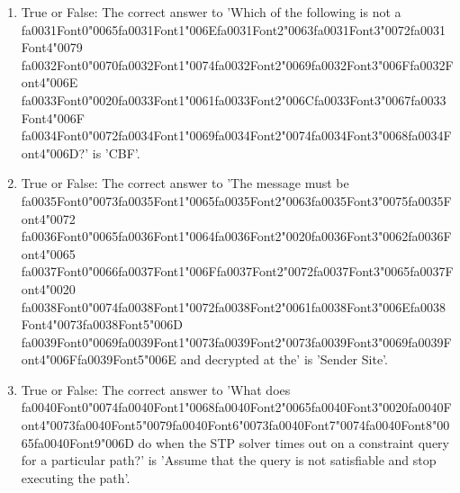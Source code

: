 \documentclass[12pt]{article}
\begin{document}
\begin{enumerate}[label=\arabic*.]
\item True or False: The correct answer to 'Which of the following is not a {\csname fa0031Font0\endcsname\char"0065}{\csname fa0031Font1\endcsname\char"006E}{\csname fa0031Font2\endcsname\char"0063}{\csname fa0031Font3\endcsname\char"0072}{\csname fa0031Font4\endcsname\char"0079} {\csname fa0032Font0\endcsname\char"0070}{\csname fa0032Font1\endcsname\char"0074}{\csname fa0032Font2\endcsname\char"0069}{\csname fa0032Font3\endcsname\char"006F}{\csname fa0032Font4\endcsname\char"006E} {\csname fa0033Font0\endcsname\char"0020}{\csname fa0033Font1\endcsname\char"0061}{\csname fa0033Font2\endcsname\char"006C}{\csname fa0033Font3\endcsname\char"0067}{\csname fa0033Font4\endcsname\char"006F} {\csname fa0034Font0\endcsname\char"0072}{\csname fa0034Font1\endcsname\char"0069}{\csname fa0034Font2\endcsname\char"0074}{\csname fa0034Font3\endcsname\char"0068}{\csname fa0034Font4\endcsname\char"006D}?' is 'CBF'.
\item True or False: The correct answer to 'The message must be {\csname fa0035Font0\endcsname\char"0073}{\csname fa0035Font1\endcsname\char"0065}{\csname fa0035Font2\endcsname\char"0063}{\csname fa0035Font3\endcsname\char"0075}{\csname fa0035Font4\endcsname\char"0072} {\csname fa0036Font0\endcsname\char"0065}{\csname fa0036Font1\endcsname\char"0064}{\csname fa0036Font2\endcsname\char"0020}{\csname fa0036Font3\endcsname\char"0062}{\csname fa0036Font4\endcsname\char"0065} {\csname fa0037Font0\endcsname\char"0066}{\csname fa0037Font1\endcsname\char"006F}{\csname fa0037Font2\endcsname\char"0072}{\csname fa0037Font3\endcsname\char"0065}{\csname fa0037Font4\endcsname\char"0020} {\csname fa0038Font0\endcsname\char"0074}{\csname fa0038Font1\endcsname\char"0072}{\csname fa0038Font2\endcsname\char"0061}{\csname fa0038Font3\endcsname\char"006E}{\csname fa0038Font4\endcsname\char"0073}{\csname fa0038Font5\endcsname\char"006D} {\csname fa0039Font0\endcsname\char"0069}{\csname fa0039Font1\endcsname\char"0073}{\csname fa0039Font2\endcsname\char"0073}{\csname fa0039Font3\endcsname\char"0069}{\csname fa0039Font4\endcsname\char"006F}{\csname fa0039Font5\endcsname\char"006E} and decrypted at the' is 'Sender Site'.
\item True or False: The correct answer to 'What does {\csname fa0040Font0\endcsname\char"0074}{\csname fa0040Font1\endcsname\char"0068}{\csname fa0040Font2\endcsname\char"0065}{\csname fa0040Font3\endcsname\char"0020}{\csname fa0040Font4\endcsname\char"0073}{\csname fa0040Font5\endcsname\char"0079}{\csname fa0040Font6\endcsname\char"0073}{\csname fa0040Font7\endcsname\char"0074}{\csname fa0040Font8\endcsname\char"0065}{\csname fa0040Font9\endcsname\char"006D} do when the STP solver times out on a constraint query for a particular path?' is 'Assume that the query is not satisfiable and stop executing the path'.
\end{enumerate}
\end{document}
